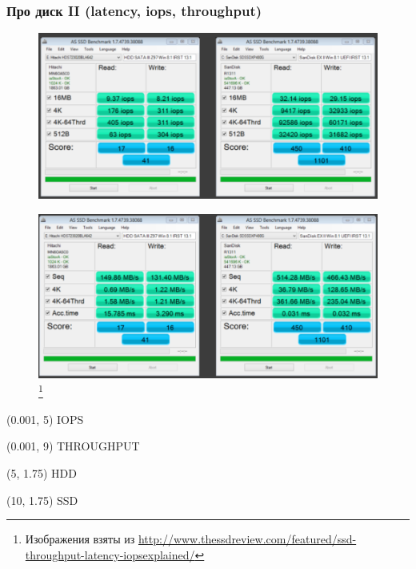 \documentclass{beamer}
\begin{document}
\begin{frame}
\frametitle{Про диск II (latency, iops, throughput)}

\begin{figure}[htb]
	\includegraphics[width=\textwidth,height=0.5\textheight,keepaspectratio]{SSD-vs-HDD-1.png} 
\end{figure}
\vspace{-5.5em}
\begin{figure}[htb]
	\includegraphics[width=\textwidth,height=0.5\textheight,keepaspectratio]{SSD-vs-HDD-2.png} 
	\footnote{\tiny{Изображения взяты из \url{http://www.thessdreview.com/featured/ssd-throughput-latency-iopsexplained/}}}
\end{figure}

\begin{textblock}{0.5}(0.001, 5)
IOPS
\end{textblock}

\begin{textblock}{0.5}(0.001, 9)
THROUGHPUT	
\end{textblock}

\begin{textblock}{0.5}(5, 1.75)
HDD	
\end{textblock}

\begin{textblock}{0.5}(10, 1.75)
SSD
\end{textblock}

\end{frame}
\end{document}
